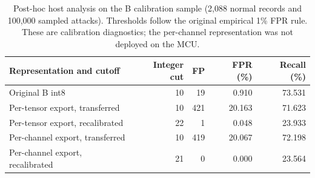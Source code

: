 \begin{table}[t]
\caption{Post-hoc host analysis on the B calibration sample (2,088 normal records and 100,000 sampled attacks). Thresholds follow the original empirical 1\% FPR rule. These are calibration diagnostics; the per-channel representation was not deployed on the MCU.}
\label{tab:posthoc-export}
\centering
\small
\begin{tabular}{lrrrr}
\toprule
Representation and cutoff & Integer cut & FP & FPR (\%) & Recall (\%)\\
\midrule
Original B int8 & 10 & 19 & 0.910 & 73.531\\
Per-tensor export, transferred & 10 & 421 & 20.163 & 71.623\\
Per-tensor export, recalibrated & 22 & 1 & 0.048 & 23.933\\
Per-channel export, transferred & 10 & 419 & 20.067 & 72.198\\
Per-channel export, recalibrated & 21 & 0 & 0.000 & 23.564\\
\bottomrule
\end{tabular}
\end{table}
